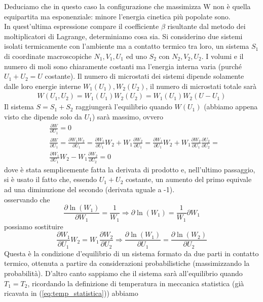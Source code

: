 \documentclass[10pt,a4paper]{article}
\begin{document}
Deduciamo che in questo caso la configurazione che massimizza W non è quella equipartita ma esponenziale: minore l'energia cinetica più popolate sono. \\
In quest'ultima espressione compare il coefficiente $\beta$ risultante dal metodo dei moltiplicatori di Lagrange, determiniamo cosa sia. Si considerino due sistemi isolati termicamente con l'ambiente ma a contatto termico tra loro, un sistema \(S_1\) di coordinate macroscopiche \(N_1, V_1, U_1\) ed uno \(S_2\) con \(N_2,V_2,U_2\). I volumi e il numero di moli sono chiaramente costanti ma l'energia interna varia (purché \(U_1+U_2 = U\) costante). Il numero di microstati dei sistemi dipende solamente dalle loro energie interne \(W_1(U_1), W_2(U_2)\), il numero di microstati totale sarà 
\begin{align*}
	W(U_1,U_2) = W_1(U_1)W_2(U_2)=W_1(U_1)W_2(U-U_1)
\end{align*} 
Il sistema \(S=S_1+S_2\) raggiungerà l'equilibrio quando \(W(U_1)\) (abbiamo appena visto che dipende solo da \(U_1\)) sarà massimo, ovvero
\begin{align*}
	&\frac{\partial W}{\partial U_1}=0\\
	&\frac{\partial W}{\partial U_1}=\frac{\partial W_1W_2}{\partial U_1}=\frac{\partial W_1}{\partial U_1}W_2+W_1\frac{\partial W_2}{\partial U_1}=\frac{\partial W_1}{\partial U_1}W_2+W_1\frac{\partial W_2}{\partial U_1}\frac{\partial U_2}{\partial U_2}=\\
	&\frac{\partial W_1}{\partial U_1}W_2-W_1\frac{\partial W_2}{\partial U_2}=0
\end{align*} 
dove è stata semplicemente fatta la derivata di prodotto e, nell'ultimo passaggio, si è usato il fatto che, essendo \(U_1+U_2 \) costante, un aumento del primo equivale ad una diminuzione del secondo (derivata uguale a -1).\\
osservando che 
\[\frac{\partial \ln(W_1)}{\partial W_1}=\frac{1}{W_1}\Rightarrow \partial \ln(W_1)=\frac{1}{W_1}\partial W_1\]
possiamo sostituire 
\[\frac{\partial W_1}{\partial U_1}W_2 = W_1\frac{\partial W_2}{\partial U_2} \Rightarrow \frac{\partial \ln(W_1)}{\partial U_1} = \frac{\partial \ln(W_2)}{\partial U_2}\]
Questa è la condizione d'equilibrio di un sistema formato da due parti in contatto termico, ottenuta a partire da considerazioni probabilistiche (massimizzando la probabilità). D'altro canto sappiamo che il sistema sarà all'equilibrio quando \(T_1 = T_2\), ricordando la definizione di temperatura in meccanica statistica (già ricavata in (\ref{eq:temp_statistica})) abbiamo 
\end{document}
